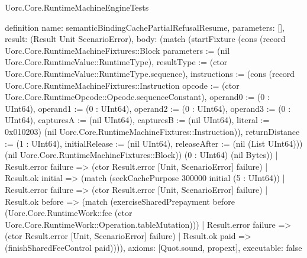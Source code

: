 \begin{lexlean}{Uorc.Core.RuntimeMachineEngineTests}
\begin{semanticmodule}
definition{
  name: semanticBindingCachePartialRefusalResume,
  parameters: [],
  result: (Result Unit ScenarioError),
  body: (match (startFixture (cons (record Uorc.Core.RuntimeMachineFixtures::Block {parameters := (nil Uorc.Core.RuntimeValue::RuntimeType), resultType := (ctor Uorc.Core.RuntimeValue::RuntimeType.sequence), instructions := (cons (record Uorc.Core.RuntimeMachineFixtures::Instruction {opcode := (ctor Uorc.Core.RuntimeOpcode::Opcode.sequenceConstant), operand0 := (0 : UInt64), operand1 := (0 : UInt64), operand2 := (0 : UInt64), operand3 := (0 : UInt64), capturesA := (nil UInt64), capturesB := (nil UInt64), literal := 0x010203}) (nil Uorc.Core.RuntimeMachineFixtures::Instruction)), returnDistance := (1 : UInt64), initialRelease := (nil UInt64), releaseAfter := (nil (List UInt64))}) (nil Uorc.Core.RuntimeMachineFixtures::Block)) (0 : UInt64) (nil Bytes))
    | Result.error failure => (ctor Result.error [Unit, ScenarioError] failure)
    | Result.ok initial => (match (seekCachePurpose 300000 initial (5 : UInt64))
      | Result.error failure => (ctor Result.error [Unit, ScenarioError] failure)
      | Result.ok before => (match (exerciseSharedPrepayment before (Uorc.Core.RuntimeWork::fee (ctor Uorc.Core.RuntimeWork::Operation.tableMutation)))
        | Result.error failure => (ctor Result.error [Unit, ScenarioError] failure)
        | Result.ok paid => (finishSharedFeeControl paid)))),
  axioms: [Quot.sound, propext],
  executable: false
}


\end{semanticmodule}
\end{lexlean}

